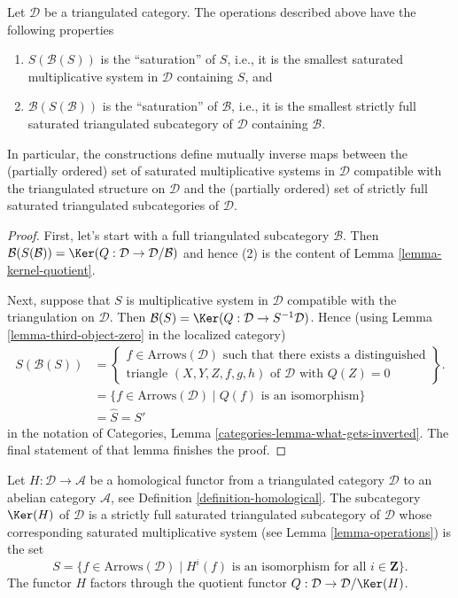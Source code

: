 \begin{lemma}
\label{lemma-operations}
Let $\mathcal{D}$ be a triangulated category. The operations described above
have the following properties
\begin{enumerate}
\item $S(\mathcal{B}(S))$ is the ``saturation'' of $S$, i.e., it is the
smallest saturated multiplicative system in $\mathcal{D}$ containing $S$, and
\item $\mathcal{B}(S(\mathcal{B}))$ is the ``saturation'' of $\mathcal{B}$,
i.e., it is the smallest strictly full saturated triangulated subcategory of
$\mathcal{D}$ containing $\mathcal{B}$.
\end{enumerate}
In particular, the constructions define mutually inverse maps between
the (partially ordered) set of saturated multiplicative systems in
$\mathcal{D}$ compatible with the triangulated structure on $\mathcal{D}$
and
the (partially ordered) set of strictly full saturated triangulated
subcategories of $\mathcal{D}$.
\end{lemma}

\begin{proof}
First, let's start with a full triangulated subcategory $\mathcal{B}$. Then
$\mathcal{B}(S(\mathcal{B})) =
\Ker(Q : \mathcal{D} \to \mathcal{D}/\mathcal{B})$
and hence (2) is the content of
Lemma \ref{lemma-kernel-quotient}.

\medskip\noindent
Next, suppose that $S$ is multiplicative system in $\mathcal{D}$ compatible
with the triangulation on $\mathcal{D}$. Then
$\mathcal{B}(S) = \Ker(Q : \mathcal{D} \to S^{-1}\mathcal{D})$.
Hence (using
Lemma \ref{lemma-third-object-zero}
in the localized category)
\begin{align*}
S(\mathcal{B}(S))
& =
\left\{
\begin{matrix}
f \in \text{Arrows}(\mathcal{D})
\text{ such that there exists a distinguished}\\
\text{triangle }(X, Y, Z, f, g, h) \text{ of }\mathcal{D}\text{ with }Q(Z) = 0
\end{matrix}
\right\}.
\\
& =
\{f \in \text{Arrows}(\mathcal{D}) \mid Q(f)\text{ is an isomorphism}\} \\
& = \hat S = S'
\end{align*}
in the notation of
Categories, Lemma \ref{categories-lemma-what-gets-inverted}.
The final statement of that lemma finishes the proof.
\end{proof}

\begin{lemma}
\label{lemma-acyclic-general}
Let $H : \mathcal{D} \to \mathcal{A}$ be a homological functor from a
triangulated category $\mathcal{D}$ to an abelian category $\mathcal{A}$, see
Definition \ref{definition-homological}.
The subcategory $\Ker(H)$ of $\mathcal{D}$ is a strictly full
saturated triangulated subcategory of $\mathcal{D}$ whose corresponding
saturated multiplicative system (see
Lemma \ref{lemma-operations})
is the set
$$
S = \{f \in \text{Arrows}(\mathcal{D}) \mid
H^i(f)\text{ is an isomorphism for all }i \in \mathbf{Z}\}.
$$
The functor $H$ factors through the quotient functor
$Q : \mathcal{D} \to \mathcal{D}/\Ker(H)$.
\end{lemma}

